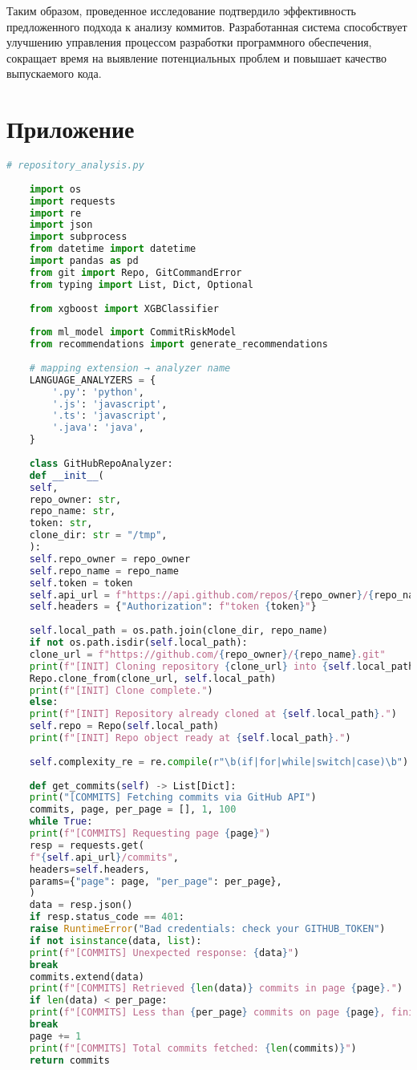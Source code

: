 Таким образом, проведенное исследование подтвердило эффективность предложенного подхода к анализу коммитов. Разработанная система способствует улучшению управления процессом разработки программного обеспечения, сокращает время на выявление потенциальных проблем и повышает качество выпускаемого кода.


\chapter*{Приложение} \label{ch5}

\begin{lstlisting}[language=Python, caption={{ \texttt{repository\_analysis.py}}}]
	# repository_analysis.py
	
	import os
	import requests
	import re
	import json
	import subprocess
	from datetime import datetime
	import pandas as pd
	from git import Repo, GitCommandError
	from typing import List, Dict, Optional
	
	from xgboost import XGBClassifier
	
	from ml_model import CommitRiskModel
	from recommendations import generate_recommendations
	
	# mapping extension → analyzer name
	LANGUAGE_ANALYZERS = {
		'.py': 'python',
		'.js': 'javascript',
		'.ts': 'javascript',
		'.java': 'java',
	}
	
	class GitHubRepoAnalyzer:
	def __init__(
	self,
	repo_owner: str,
	repo_name: str,
	token: str,
	clone_dir: str = "/tmp",
	):
	self.repo_owner = repo_owner
	self.repo_name = repo_name
	self.token = token
	self.api_url = f"https://api.github.com/repos/{repo_owner}/{repo_name}"
	self.headers = {"Authorization": f"token {token}"}
	
	self.local_path = os.path.join(clone_dir, repo_name)
	if not os.path.isdir(self.local_path):
	clone_url = f"https://github.com/{repo_owner}/{repo_name}.git"
	print(f"[INIT] Cloning repository {clone_url} into {self.local_path}")
	Repo.clone_from(clone_url, self.local_path)
	print(f"[INIT] Clone complete.")
	else:
	print(f"[INIT] Repository already cloned at {self.local_path}.")
	self.repo = Repo(self.local_path)
	print(f"[INIT] Repo object ready at {self.local_path}.")
	
	self.complexity_re = re.compile(r"\b(if|for|while|switch|case)\b")
	
	def get_commits(self) -> List[Dict]:
	print("[COMMITS] Fetching commits via GitHub API")
	commits, page, per_page = [], 1, 100
	while True:
	print(f"[COMMITS] Requesting page {page}")
	resp = requests.get(
	f"{self.api_url}/commits",
	headers=self.headers,
	params={"page": page, "per_page": per_page},
	)
	data = resp.json()
	if resp.status_code == 401:
	raise RuntimeError("Bad credentials: check your GITHUB_TOKEN")
	if not isinstance(data, list):
	print(f"[COMMITS] Unexpected response: {data}")
	break
	commits.extend(data)
	print(f"[COMMITS] Retrieved {len(data)} commits in page {page}.")
	if len(data) < per_page:
	print(f"[COMMITS] Less than {per_page} commits on page {page}, finishing.")
	break
	page += 1
	print(f"[COMMITS] Total commits fetched: {len(commits)}")
	return commits
	

\end{lstlisting}

